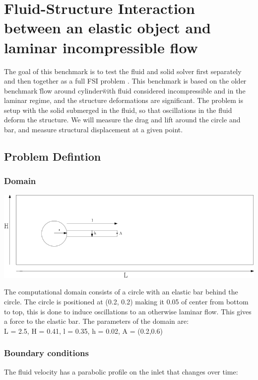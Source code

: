 
\section{Fluid-Structure Interaction between an elastic object and laminar incompressible flow}
The goal of this benchmark is to test the fluid and solid solver first separately and then together as a full FSI problem \cite{Hron2006a}. This benchmark is based on the older benchmark \" flow around cylinder\" with fluid considered incompressible and in the laminar regime, and the structure deformations are significant. The problem is setup with the solid submerged in the fluid, so that oscillations in the fluid deform the structure. We will measure the drag and lift around the circle and bar, and measure structural displacement at a given point. 

\subsection{Problem Defintion}
\subsubsection*{Domain}
\begin{center}
\includegraphics[scale=0.4]{./Verification_Validation/Hron_Turek/Domain_drawing.png}
\end{center}
The computational domain consists of a circle with an elastic bar behind the circle. The circle is positioned at (0.2, 0.2) making it 0.05 of center from bottom to top, this is done to induce oscillations to an otherwise laminar flow. 
This gives a force to the elastic bar. The parameters of the domain are:\\
L = 2.5, H = 0.41, l = 0.35, h = 0.02, A = (0.2,0.6) \\

\subsubsection*{Boundary conditions}
The fluid velocity has a parabolic profile on the inlet that changes over time:\\

